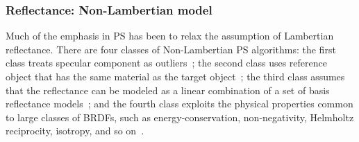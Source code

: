 \subsubsection{Reflectance: Non-Lambertian model}
Much of the emphasis in PS has been to relax the assumption of Lambertian reflectance. There are four classes of Non-Lambertian PS algorithms: the first class treats specular component as outliers~\cite{coleman1982obtaining,barsky20034,ikeuchi1981determining,nayar1990determining}; the second class uses reference object that has the same material as the target object~\cite{hertzmann2005example}; the third class assumes that the reflectance can be modeled as a linear combination of a set of basis reflectance models~\cite{goldman2010shape,alldrin2008photometric}; and the fourth class exploits the physical properties common to large classes of BRDFs, such as energy-conservation, non-negativity, Helmholtz reciprocity, isotropy, and so on~\cite{zickler2002helmholtz,tan2007isotropy,alldrin2007toward}.




